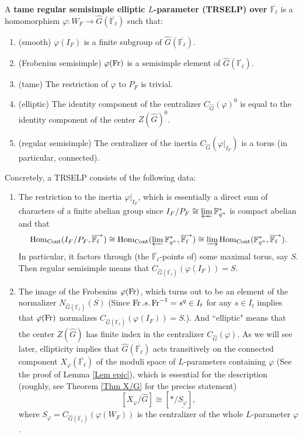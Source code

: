 	\begin{definition}\label{Def TRSELP}
		A \textbf{tame regular semisimple elliptic $L$-parameter (TRSELP) over $\overline{\mathbb{F}_{\ell}}$} is a homomorphism $\varphi: W_F \to \hat{G}(\overline{\mathbb{F}_{\ell}})$ such that:
		\begin{enumerate}
			\item (smooth) $\varphi(I_F)$ is a finite subgroup of $\hat{G}(\overline{\mathbb{F}_{\ell}})$.
			\item (Frobenius semisimple) $\varphi(\operatorname{Fr})$ is a semisimple element of $\hat{G}(\overline{\mathbb{F}_{\ell}})$.
			\item (tame) The restriction of $\varphi$ to $P_F$ is trivial.
			\item \label{elliptic} (elliptic) The identity component of the centralizer $C_{\hat{G}}(\varphi)^0$ is equal to the identity component of the center $Z(\hat{G})^0$.
			\item \label{regular semisimple}(regular semisimple) The centralizer of the inertia $C_{\hat{G}}(\varphi|_{I_F})$ is a torus (in particular, connected).
		\end{enumerate}
	\end{definition}

    Concretely, a TRSELP consists of the following data:
    
    \begin{enumerate}
    	\item The restriction to the inertia $\varphi|_{I_F}$, which is essentially a direct sum of characters of a finite abelian group since $I_F/P_F \cong \varprojlim\mathbb{F}_{q^n}^*$ is compact abelian and that
    	$$\operatorname{\operatorname{Hom}}_{\operatorname{Cont}}(I_F/P_F, \overline{\mathbb{F}_{\ell}}^*) \cong \operatorname{\operatorname{Hom}}_{\operatorname{Cont}}(\varprojlim\mathbb{F}_{q^n}^*, \overline{\mathbb{F}_{\ell}}^*) \cong \varinjlim\operatorname{\operatorname{Hom}}_{\operatorname{Cont}}(\mathbb{F}_{q^n}^*, \overline{\mathbb{F}_{\ell}}^*).$$
    	In particular, it factors through (the $\overline{\mathbb{F}_{\ell}}$-points of) some maximal torus, say $S$. Then regular semisimple means that $C_{\hat{G}(\overline{\mathbb{F}_{\ell}})}(\varphi(I_F))=S$.
    	\item The image of the Frobenius $\varphi(\operatorname{Fr})$, which turns out to be an element of the normalizer $N_{\hat{G}(\overline{\mathbb{F}_{\ell}})}(S)$ (Since $\operatorname{Fr}.s.\operatorname{Fr}^{-1}=s^q \in I_t$ for any $s \in I_t$ implies that $\varphi(\operatorname{Fr})$ normalizes $C_{\hat{G}(\overline{\mathbb{F}_{\ell}})}(\varphi(I_F))=S$.). 
        And ``elliptic" means that the center $Z(\hat{G})$ has finite index in the centralizer $C_{\hat{G}}(\varphi)$. As we will see later, ellipticity implies that $\hat{G}(\overline{\mathbb{F}_{\ell}})$ acts transitively on the connected component $X_{\varphi}(\overline{\mathbb{F}_{\ell}})$ of the moduli space of $L$-parameters containing $\varphi$ (See the proof of Lemma \ref{Lem epic}), which is essential for the description (roughly, see Theorem \ref{Thm X/G} for the precise statement)
    	$$[X_{\varphi}/\hat{G}] \cong [*/\underline{S_{\varphi}}],$$
    	where $S_\varphi=C_{\hat{G}(\overline{\mathbb{F}_{\ell}})}(\varphi(W_F))$ is the centralizer of the whole $L$-parameter $\varphi$.
    \end{enumerate}


